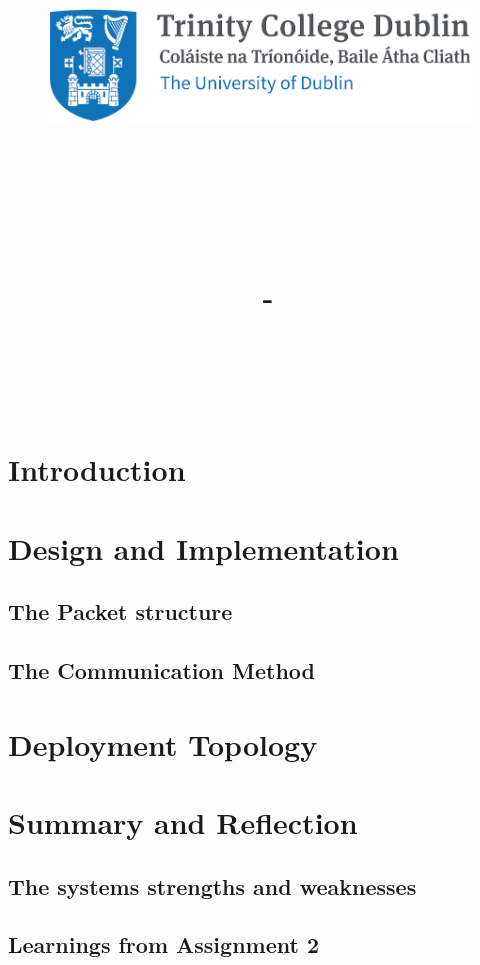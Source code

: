 \documentclass{article}
\title{
    \vspace{-1in}
    \begin{figure}[!ht]
    \flushleft
    \includegraphics[width=0.4\linewidth]{reduced-trinity.png}
    \end{figure}
    \vspace{-0.5cm}
    \hrulefill \\
    \vspace{1cm}
    \textmd{\textbf{\moduleCode\ \moduleName}}\\
    \textmd{\textbf{\assignmentTitle}}\\
    \textmd{\authorName\ - \authorID}\\
    \textmd{\reportDate}\\
    \vspace{0.5cm}
    \hrulefill \\
}
\date{}
\author{}
\begin{document}
    \lstset{language=bash, float=h, captionpos=b, frame=single, numbers=left, numberblanklines=false, numberstyle=\tiny, numbersep=1mm, framexleftmargin=3mm, xleftmargin=5mm, aboveskip=3mm, breaklines=true}
    \captionsetup{width=.8\linewidth} 
    
    \maketitle
    \tableofcontents
    \newpage
    
    \section{Introduction}
    \label{sec:Intro}
    
    
    \section{Design and Implementation}
    \label{sec:Design}
    
    \subsection{The Packet structure}
    \label{subsec:PacketStructure}
    
    
    \subsection{The Communication Method}
    \label{subsec:communication}
    
    
    \newpage
    \section{Deployment Topology}
    \label{sec:Topology}
    
    \newpage
    \section{Summary and Reflection}
    \label{sec:summary}
    
    \subsection{The systems strengths and weaknesses}
    
    \subsection{Learnings from Assignment 2}
    
    
\end{document}
